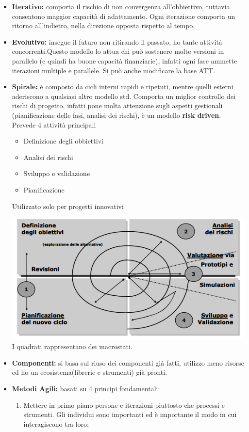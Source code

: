 \begin{itemize}
	\item \textbf{Iterativo:} comporta il rischio di non convergenza all'obbiettivo, tuttavia consentono maggior capacità di adattamento. Ogni iterazione comporta un ritorno all'indietro, nella direzione opposta rispetto al tempo.
	\item \textbf{Evolutivo:} insegue il futuro non ritirando il passato, ho tante attività concorrenti.Questo modello lo attua chi può sostenere molte versioni in parallelo (e quindi ha buone capacità finanziarie), infatti ogni fase ammette iterazioni multiple e parallele. Si può anche modificare la base ATT.
	\item\textbf{Spirale:} è composto da cicli interni rapidi e ripetuti, mentre quelli esterni aderiscono a qualsiasi altro modello std. Comporta un miglior controllo dei rischi di progetto, infatti pone molta attenzione sugli aspetti gestionali (pianificazione delle fasi, analisi dei rischi), è un modello \textbf{risk driven}. Prevede 4 attività principali 				 		\begin{itemize}
			\item Definizione degli obbiettivi
			\item Analisi dei rischi
			\item Sviluppo e validazione
			\item Pianificazione
		\end{itemize}
	Utilizzato solo per progetti innovativi
		
		\includegraphics[width=0.75\columnwidth]{img5} %
		\\
		I quadrati rappresentano dei macrostati.
		\item \textbf{Componenti:} si basa sul riuso dei componenti già fatti, utilizzo meno risorse ed ho un ecosistema(librerie e strumenti) già pronti.
	\item \textbf{Metodi Agili:} basati su 4 principi fondamentali:
	\begin{enumerate}

		\item Mettere in primo piano persone e iterazioni piuttosto che processi e strumenti. Gli individui sono importanti ed è importante il modo in cui interagiscono tra loro;
	

\end{enumerate}
\end{itemize}
